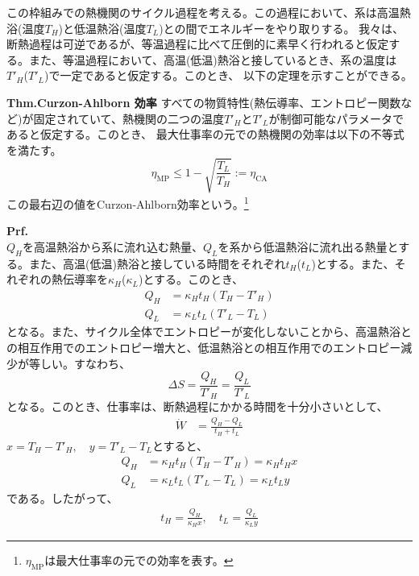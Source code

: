 \documentclass[a4paper,10.5pt]{jsarticle}
\numberwithin{equation}{section}
\begin{document}
この枠組みでの熱機関のサイクル過程を考える。この過程において、系は高温熱浴(温度$T_{H}$)と低温熱浴(温度$T_{L}$)との間でエネルギーをやり取りする。
我々は、断熱過程は可逆であるが、等温過程に比べて圧倒的に素早く行われると仮定する。また、等温過程において、高温(低温)熱浴と接しているとき、系の温度は$T'_H$($T'_L$)で一定であると仮定する。このとき、
以下の定理を示すことができる。

\begin{itembox}[l]{\textbf{Thm.Curzon-Ahlborn 効率}}
  すべての物質特性(熱伝導率、エントロピー関数など)が固定されていて、熱機関の二つの温度$T'_H$と$T'_L$が制御可能なパラメータであると仮定する。このとき、
  最大仕事率の元での熱機関の効率は以下の不等式を満たす。
  \begin{equation}
    \eta_{\text{MP}} \leq 1 - \sqrt{\frac{T_L}{T_H}} := \eta_{\text{CA}}
  \end{equation}
  この最右辺の値をCurzon-Ahlborn効率という。\footnote{$\eta_{\text{MP}}$は最大仕事率の元での効率を表す。}
\end{itembox}
\textbf{Prf.}\\
$Q_{H}$を高温熱浴から系に流れ込む熱量、$Q_{L}$を系から低温熱浴に流れ出る熱量とする。また、高温(低温)熱浴と接している時間をそれぞれ$t_{H}$($t_{L}$)とする。また、それぞれの熱伝導率を$\kappa_{H}$($\kappa_{L}$)とする。このとき、
\begin{align}
  Q_{H} &= \kappa_{H}t_{H}(T_{H}-T'_{H})\\
  Q_{L} &= \kappa_{L}t_{L}(T'_{L}-T_{L})
\end{align}
となる。また、サイクル全体でエントロピーが変化しないことから、高温熱浴との相互作用でのエントロピー増大と、低温熱浴との相互作用でのエントロピー減少が等しい。すなわち、
\begin{equation}
  \Delta S = \frac{Q_{H}}{T'_{H}} = \frac{Q_{L}}{T'_{L}}
\end{equation}
となる。このとき、仕事率は、断熱過程にかかる時間を十分小さいとして、
\begin{align}
  \dot{W} &= \frac{Q_{H} - Q_{L}}{t_{H} + t_{L}}
\end{align}
$x = T_{H} - T'_{H},\quad y = T'_{L} - T_{L}$とすると、
\begin{align}
  Q_{H} &= \kappa_{H}t_{H}(T_{H}-T'_{H}) = \kappa_{H}t_{H}x\\
  Q_{L} &= \kappa_{L}t_{L}(T'_{L}-T_{L}) = \kappa_{L}t_{L}y
\end{align}
である。したがって、
\begin{align}
  t_{H} = \frac{Q_{H}}{\kappa_{H}x},\quad t_{L} = \frac{Q_{L}}{\kappa_{L}y}
\end{align}
\end{document}
